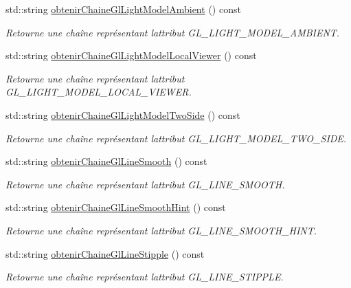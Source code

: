 \begin{DoxyCompactItemize}
std\+::string \hyperlink{group__utilitaire_gafee564b101971fe6c901050b13522dc7}{obtenir\+Chaine\+Gl\+Light\+Model\+Ambient} () const 
\begin{DoxyCompactList}\small\item\em Retourne une chaîne représentant l\textquotesingle{}attribut G\+L\+\_\+\+L\+I\+G\+H\+T\+\_\+\+M\+O\+D\+E\+L\+\_\+\+A\+M\+B\+I\+E\+N\+T. \end{DoxyCompactList}\item 
std\+::string \hyperlink{group__utilitaire_gad3dbc66405e9f773549840afceebda51}{obtenir\+Chaine\+Gl\+Light\+Model\+Local\+Viewer} () const 
\begin{DoxyCompactList}\small\item\em Retourne une chaîne représentant l\textquotesingle{}attribut G\+L\+\_\+\+L\+I\+G\+H\+T\+\_\+\+M\+O\+D\+E\+L\+\_\+\+L\+O\+C\+A\+L\+\_\+\+V\+I\+E\+W\+E\+R. \end{DoxyCompactList}\item 
std\+::string \hyperlink{group__utilitaire_gab355049dd400e05dcf9057355f954b2d}{obtenir\+Chaine\+Gl\+Light\+Model\+Two\+Side} () const 
\begin{DoxyCompactList}\small\item\em Retourne une chaîne représentant l\textquotesingle{}attribut G\+L\+\_\+\+L\+I\+G\+H\+T\+\_\+\+M\+O\+D\+E\+L\+\_\+\+T\+W\+O\+\_\+\+S\+I\+D\+E. \end{DoxyCompactList}\item 
std\+::string \hyperlink{group__utilitaire_ga3823c538863f06203e0f72df0af8e517}{obtenir\+Chaine\+Gl\+Line\+Smooth} () const 
\begin{DoxyCompactList}\small\item\em Retourne une chaîne représentant l\textquotesingle{}attribut G\+L\+\_\+\+L\+I\+N\+E\+\_\+\+S\+M\+O\+O\+T\+H. \end{DoxyCompactList}\item 
std\+::string \hyperlink{group__utilitaire_ga259303d6900794169347807035689bc8}{obtenir\+Chaine\+Gl\+Line\+Smooth\+Hint} () const 
\begin{DoxyCompactList}\small\item\em Retourne une chaîne représentant l\textquotesingle{}attribut G\+L\+\_\+\+L\+I\+N\+E\+\_\+\+S\+M\+O\+O\+T\+H\+\_\+\+H\+I\+N\+T. \end{DoxyCompactList}\item 
std\+::string \hyperlink{group__utilitaire_gae6a2fafc56ddcffeb516c7e7451ee620}{obtenir\+Chaine\+Gl\+Line\+Stipple} () const 
\begin{DoxyCompactList}\small\item\em Retourne une chaîne représentant l\textquotesingle{}attribut G\+L\+\_\+\+L\+I\+N\+E\+\_\+\+S\+T\+I\+P\+P\+L\+E. \end{DoxyCompactList}\item 

\end{DoxyCompactItemize}
